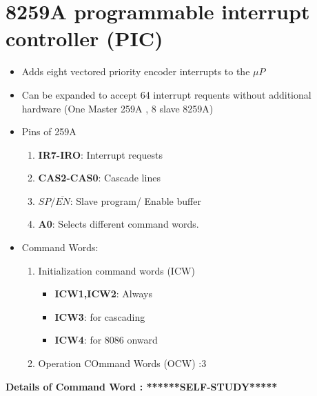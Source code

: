 \section{8259A programmable interrupt controller (PIC)}
\begin{itemize}
  \item Adds eight vectored priority encoder interrupts to the $\mu P$
  \item Can be expanded to accept 64 interrupt requents without additional hardware (One Master 259A , 8 slave 8259A)
  \item Pins of 259A
  \begin{enumerate}
    \item \textbf{IR7-IRO}: Interrupt requests
    \item \textbf{CAS2-CAS0}: Cascade lines
    \item $SP/\overline{EN}$: Slave program/ Enable buffer
    \item \textbf{A0}: Selects different command words.
  \end{enumerate}
  \item Command Words:
  \begin{enumerate}
    \item Initialization command words (ICW)
    \begin{itemize}
      \item \textbf{ICW1,ICW2}: Always
      \item \textbf{ICW3}: for cascading
      \item \textbf{ICW4}: for 8086 onward
    \end{itemize}
    \item Operation COmmand Words (OCW) :3
  \end{enumerate}
\end{itemize}

\textbf{Details of Command Word : ******SELF-STUDY*****}
